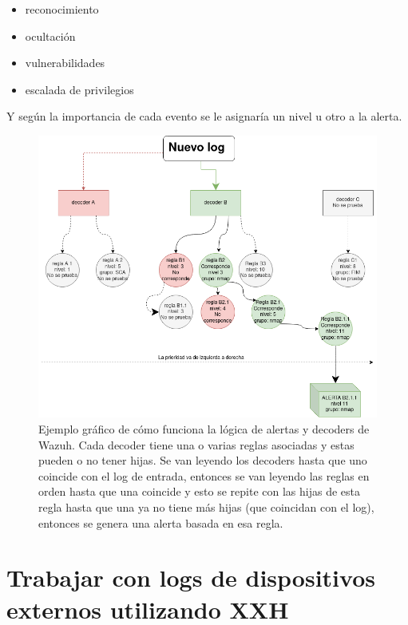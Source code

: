 \begin{itemize}
    \item reconocimiento
    \item ocultación
    \item vulnerabilidades
    \item escalada de privilegios
\end{itemize}

Y según la importancia de cada evento se le asignaría un nivel u otro a la alerta.


\begin{figure}[!hbt]
  \centering
  \includegraphics[width=\textwidth]{imagenes/arbol_wazuh.png}
  \caption{Ejemplo gráfico de cómo funciona la lógica de alertas y decoders de Wazuh. Cada decoder tiene una o varias reglas asociadas y estas pueden o no tener hijas. Se van leyendo los decoders hasta que uno coincide con el log de entrada, entonces se van leyendo las reglas en orden hasta que una coincide y esto se repite con las hijas de esta regla hasta que una ya no tiene más hijas (que coincidan con el log), entonces se genera una alerta basada en esa regla.}
  \label{wazuhtree}
\end{figure}




\section{Trabajar con logs de dispositivos externos utilizando XXH}

